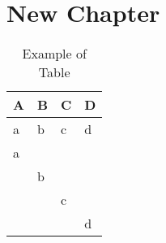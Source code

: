 \chapter{New Chapter}

\begin{table}[h!]
\renewcommand{\arraystretch}{1.3}
\centering
\begin{tabular}{l p{1.5cm} p{1.5cm} p{1.5cm}}
\hline
 A & B & C & D  \\ \hline \hline
a & b & c & d\\ \hline
a & & & \\ \hline
 & b & & \\ \hline
 & & c & \\ \hline
 & & & d\\ \hline
\end{tabular}
\caption{Example of Table}
\end{table}